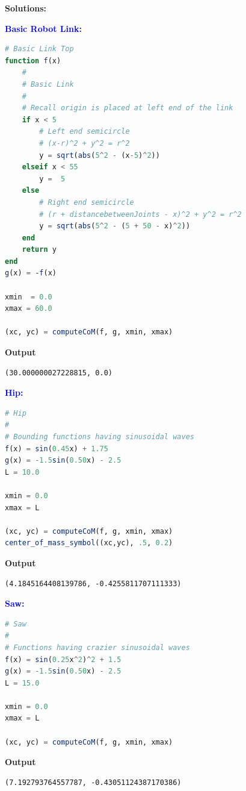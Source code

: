 \textbf{Solutions:}

\textcolor{blue}{\bf Basic Robot Link:}
\begin{lstlisting}[language=Julia,style=mystyle]
# Basic Link Top  
function f(x)
    #
    # Basic Link
    #
    # Recall origin is placed at left end of the link
    if x < 5
        # Left end semicircle
        # (x-r)^2 + y^2 = r^2
        y = sqrt(abs(5^2 - (x-5)^2))
    elseif x < 55
        y =  5
    else
        # Right end semicircle
        # (r + distancebetweenJoints - x)^2 + y^2 = r^2
        y = sqrt(abs(5^2 - (5 + 50 - x)^2))
    end
    return y    
end
g(x) = -f(x)

xmin  = 0.0
xmax = 60.0

(xc, yc) = computeCoM(f, g, xmin, xmax)
\end{lstlisting}
\textbf{Output} 
\begin{verbatim}
(30.000000027228815, 0.0)
\end{verbatim}

\bigskip 

\textcolor{blue}{\bf Hip:}
\begin{lstlisting}[language=Julia,style=mystyle]
# Hip 
# 
# Bounding functions having sinusoidal waves
f(x) = sin(0.45x) + 1.75
g(x) = -1.5sin(0.50x) - 2.5
L = 10.0

xmin = 0.0
xmax = L

(xc, yc) = computeCoM(f, g, xmin, xmax)
center_of_mass_symbol((xc,yc), .5, 0.2)
\end{lstlisting}
\textbf{Output} 
\begin{verbatim}
(4.1845164408139786, -0.4255811707111333)
\end{verbatim}

\bigskip 
\textcolor{blue}{\bf Saw:}
\begin{lstlisting}[language=Julia,style=mystyle]
# Saw
#
# Functions having crazier sinusoidal waves
f(x) = sin(0.25x^2)^2 + 1.5
g(x) = -1.5sin(0.50x) - 2.5
L = 15.0

xmin = 0.0
xmax = L

(xc, yc) = computeCoM(f, g, xmin, xmax)
\end{lstlisting}
\textbf{Output} 
\begin{verbatim}
(7.192793764557787, -0.43051124387170386)
\end{verbatim}

